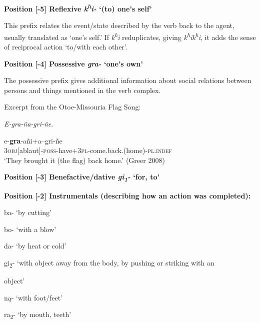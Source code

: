 \documentclass[output=paper]{LSP/langsci}
\begin{document}
\vspace{1em}
\textbf{Position [-5]  Reflexive \textit{k\textsuperscript{h}i-}  `(to) one's self'}		
				     		     	       
This prefix relates the event/state described by the verb back to the agent, usually translated as `one's self.' If \textit{k\textsuperscript{h}i} reduplicates, giving \textit{k\textsuperscript{h}ik\textsuperscript{h}i}, it adds the sense of reciprocal action `to/with each other'.  

\vspace{1em}
\textbf{Position [-4] Possessive  \textit{gra-}  `one's own'}	
						      
The possessive prefix gives additional information about social relations between persons and things mentioned in the verb complex.				
\begin{exe}
\ex	Excerpt from the Otoe-Missouria Flag Song:  	
						           
\textit{E-gra-\~na-gri-\~ne}.

\gll e-\textbf{gra}-a\~ni+a--gri-\~ne \\		     
3\textsc{obj}[ablaut]-\textsc{poss}-have+3\textsc{pl}-come.back.(home)-\textsc{pl.indef} \\
\trans `They brought it (the flag) back home.' (Greer 2008)	 
\end{exe}

\textbf{Position [-3]  Benefactive/dative \textit{gi\textsubscript{1}-} `for, to'}    					         

\vspace{1em}
\textbf{Position [-2]  Instrumentals (describing how an action was completed):}					

\hspace{2em} ba- `by cutting' 
			
\hspace{2em} bo- `with a blow'      	

\hspace{2em} da- `by heat or cold' 	

\hspace{2em} gi\textsubscript{2}- `with object away from the body, by pushing or striking with an 

\hspace{3em} object' 			

\hspace{2em} n\k{a}- `with foot/feet'		

\hspace{2em} ra\textsubscript{2}- `by mouth, teeth'				
\end{document}
